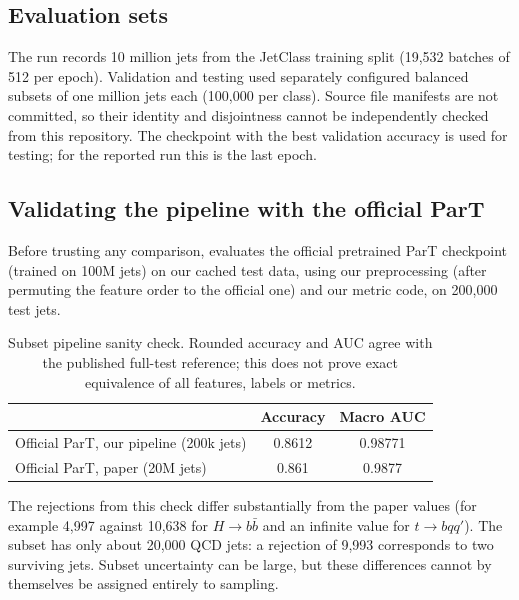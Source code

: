 \documentclass[11pt,a4paper]{article}
\newcommand{\code}[1]{\texttt{\small\detokenize{#1}}}
\numberwithin{equation}{section}
\begin{document}
\subsection{Evaluation sets}
The run records 10 million jets from the JetClass training split (19,532 batches of 512
per epoch). Validation and testing used separately configured balanced subsets of one
million jets each (100,000 per class). Source file manifests are not committed, so
their identity and disjointness cannot be independently checked from this repository.
The checkpoint with the best validation accuracy is used for testing; for the reported
run this is the last epoch.

\subsection{Validating the pipeline with the official ParT}\label{sec:validation}
Before trusting any comparison, \code{validate_pipeline.py} evaluates the official pretrained
ParT checkpoint (trained on 100M jets) on our cached test data, using our preprocessing (after
permuting the feature order to the official one) and our metric code, on 200,000 test jets.

\begin{table}[ht]
\centering\small
\begin{tabular}{lcc}
\toprule & Accuracy & Macro AUC\\ \midrule
Official ParT, our pipeline (200k jets) & 0.8612 & 0.98771\\
Official ParT, paper (20M jets) & 0.861 & 0.9877\\
\bottomrule
\end{tabular}
\caption{Subset pipeline sanity check. Rounded accuracy and AUC agree with the
published full-test reference; this does not prove exact equivalence of all
features, labels or metrics.}
\label{tab:validation}
\end{table}
The rejections from this check differ substantially from the paper values (for example 4,997 against
10,638 for $H\to b\bar b$ and an infinite value for $t\to bqq'$). The subset has only about 20,000 QCD
jets: a rejection of 9,993 corresponds to two surviving jets. Subset uncertainty can be large,
but these differences cannot by themselves be assigned entirely to sampling.
\end{document}
